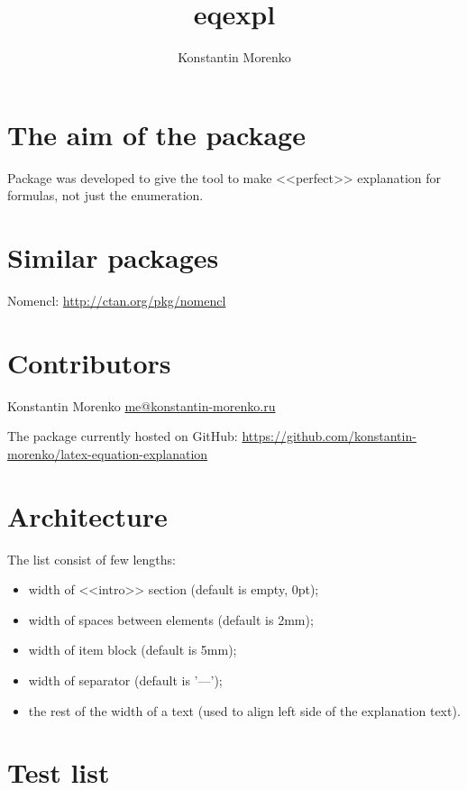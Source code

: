 \documentclass{article}
\begin{document}
\title{eqexpl}
\author{Konstantin Morenko}

\maketitle

\section{The aim of the package}

Package was developed to give the tool to make <<perfect>> explanation
for formulas, not just the enumeration.

\section{Similar packages}

Nomencl: \href{http://ctan.org/pkg/nomencl}{http://ctan.org/pkg/nomencl}

\section{Contributors}

Konstantin Morenko \href{mailto:me@konstantin-morenko.ru}{me@konstantin-morenko.ru}

The package currently hosted on GitHub:
\href{https://github.com/konstantin-morenko/latex-equation-explanation}{https://github.com/konstantin-morenko/latex-equation-explanation}

\section{Architecture}

The list consist of few lengths:
\begin{itemize}
\item width of <<intro>> section (default is empty, 0pt);
\item width of spaces between elements (default is 2mm);
\item width of item block (default is 5mm);
\item width of separator (default is '---');
\item the rest of the width of a text (used to align left side of the
  explanation text).
\end{itemize}

\section{Test list}
\end{document}
